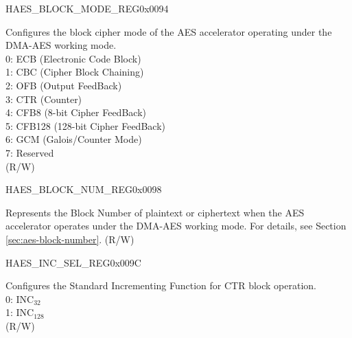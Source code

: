 \begin{register}{H}{AES\_BLOCK\_MODE\_REG}{0x0094}\label{regdesc:AESBLOCKMODEREG}
%
%
\regnewline%
\begin{regdesc}\begin{reglist}
\label{fielddesc:AESBLOCKMODE}\item [AES\_BLOCK\_MODE] Configures the block cipher mode of the AES accelerator operating under the DMA-AES working mode. \\
0: ECB (Electronic Code Block)\\
1: CBC (Cipher Block Chaining)\\
2: OFB (Output FeedBack)\\
3: CTR (Counter)\\
4: CFB8 (8-bit Cipher FeedBack)\\
5: CFB128 (128-bit Cipher FeedBack)\\
6: GCM (Galois/Counter Mode)\\
7: Reserved\\ (R/W)
\end{reglist}\end{regdesc}
\end{register}


\begin{register}{H}{AES\_BLOCK\_NUM\_REG}{0x0098}\label{regdesc:AESBLOCKNUMREG}
%
\regnewline%
\begin{regdesc}\begin{reglist}
\label{fielddesc:AESBLOCKNUM}\item [AES\_BLOCK\_NUM] Represents the Block Number of plaintext or ciphertext when the AES accelerator operates under the DMA-AES working mode. For details, see Section \ref{sec:aes-block-number}. (R/W)
\end{reglist}\end{regdesc}
\end{register}


\begin{register}{H}{AES\_INC\_SEL\_REG}{0x009C}\label{regdesc:AESINCSELREG}
%
%
\regnewline%
\begin{regdesc}\begin{reglist}
\label{fielddesc:AESINCSEL}\item [AES\_INC\_SEL] Configures the Standard Incrementing Function for CTR block operation. \\
0: INC$_{32}$\\
1: INC$_{128}$\\ (R/W)
\end{reglist}\end{regdesc}
\end{register}


